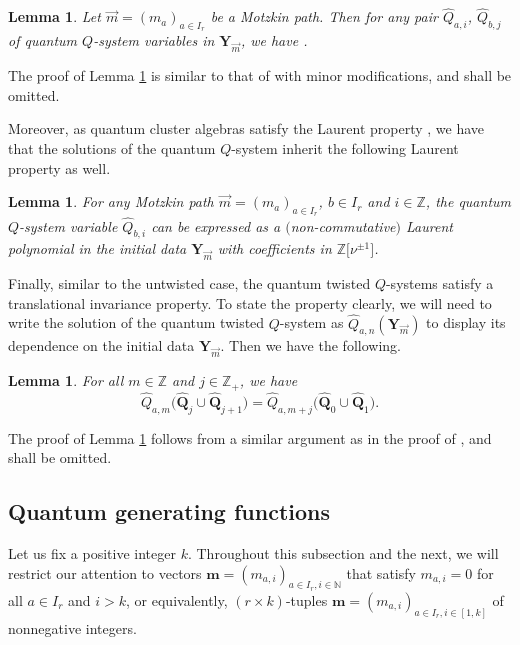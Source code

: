 \documentclass[pdftex]{sigma}
\numberwithin{equation}{section}
\newtheorem{Lemma}[Theorem]{Lemma}
\begin{document}
\begin{Lemma}\label{4.1}
Let $\vec{m}=(m_a)_{a\in I_r}$ be a Motzkin path. Then for any pair $\widehat{Q}_{a,i}$, $\widehat{Q}_{b,j}$ of quantum $Q$-system variables in $\mathbf{Y}_{\vec{m}}$, we have
.
\end{Lemma}

The proof of Lemma \ref{4.1} is similar to that of \cite[Lemma~3.2]{DFK14} with minor modifications, and shall be omitted.

Moreover, as quantum cluster algebras satisfy the Laurent property \cite[Corollary~5.2]{BZ05}, we have that the solutions of the quantum $Q$-system inherit the following Laurent property as well.

\begin{Lemma}\label{4.2}
For any Motzkin path $\vec{m}=(m_a)_{a\in I_r}$, $b\in I_r$ and $i\in\mathbb{Z}$, the quantum $Q$-system variable $\widehat{Q}_{b,i}$ can be expressed as a $($non-commutative$)$ Laurent polynomial in the initial data $\mathbf{Y}_{\vec{m}}$ with coefficients in $\mathbb{Z}\bigl[\nu^{\pm1}\bigr]$.
\end{Lemma}

Finally, similar to the untwisted case, the quantum twisted $Q$-systems satisfy a translational invariance property. To state the property clearly, we will need to write the solution of the quantum twisted $Q$-system as $\widehat{Q}_{a,n}(\mathbf{Y}_{\vec{m}})$ to display its dependence on the initial data $\mathbf{Y}_{\vec{m}}$. Then we have the following.

\begin{Lemma}\label{4.3}
For all $m\in\mathbb{Z}$ and $j\in\mathbb{Z}_+$, we have
\[
\widehat{Q}_{a,m}\bigl(\widehat{\mathbf{Q}}_j\cup\widehat{ \mathbf{Q}}_{j+1}\bigr)
=\widehat{Q}_{a,m+j}\bigl(\widehat{\mathbf{Q}}_0\cup\widehat{ \mathbf{Q}}_1\bigr).
\]
\end{Lemma}

The proof of Lemma \ref{4.3} follows from a similar argument as in the proof of \cite[Lemma 4.10]{DFK14}, and shall be omitted.

\subsection{Quantum generating functions}\label{Section 4.2}

Let us fix a positive integer $k$. Throughout this subsection and the next, we will restrict our attention to vectors $\mathbf{m}=(m_{a,i})_{a\in I_r,i\in\mathbb{N}}$ that satisfy $m_{a,i}=0$ for all $a\in I_r$ and $i>k$, or equivalently, $(r\times k)$-tuples $\mathbf{m}=(m_{a,i})_{a\in I_r,i\in[1,k]}$ of nonnegative integers.
\end{document}
